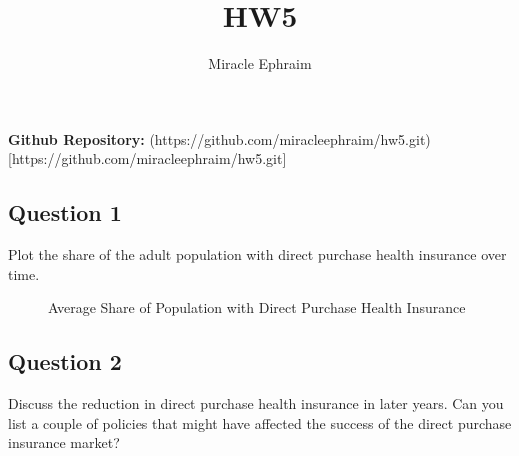 \documentclass[
]{article}
\title{HW5}
\author{Miracle Ephraim}
\date{}
\begin{document}
\maketitle


\textbf{Github Repository:}
(https://github.com/miracleephraim/hw5.git){[}https://github.com/miracleephraim/hw5.git{]}

\subsection{Question 1}\label{question-1}

Plot the share of the adult population with direct purchase health
insurance over time.

\begin{figure}


\caption{\label{fig-q1}Average Share of Population with Direct Purchase
Health Insurance}

\end{figure}%

\subsection{Question 2}\label{question-2}

Discuss the reduction in direct purchase health insurance in later
years. Can you list a couple of policies that might have affected the
success of the direct purchase insurance market?
\end{document}
